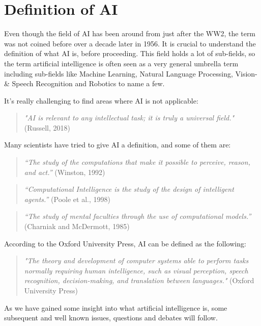\documentclass[
a4paper,
11pt,
english
]{report}
\begin{document}
\section{Definition of AI}
Even though the field of AI has been around from just after the WW2, the term was not coined before over a decade later in 1956. It is crucial to understand the definition of what AI is, before proceeding. This field holds a lot of sub-fields, so the term artificial intelligence is often seen as a very general umbrella term including sub-fields like Machine Learning, Natural Language Processing, Vision- \& Speech Recognition and Robotics to name a few.

It's really challenging to find areas where AI is not applicable:

\begin{quote}
    \textit{"AI is relevant to any intellectual task; it is truly a universal field."} (Russell, 2018)
\end{quote}

Many scientists have tried to give AI a definition, and some of them are:

\begin{quote}
    \textit{“The study of the computations that make it possible to perceive, reason, and act.”} (Winston, 1992)
\end{quote}

\begin{quote}
    \textit{“Computational Intelligence is the study of the design of intelligent agents.”} (Poole et al., 1998)
\end{quote}

\begin{quote}
    \textit{“The study of mental faculties through the use of computational models.”} (Charniak and McDermott, 1985)
\end{quote}

According to the Oxford University Press, AI can be defined as the following:

\begin{quote}
    \textit{"The theory and development of computer systems able to perform tasks normally requiring human intelligence, such as visual perception, speech recognition, decision-making, and translation between languages."} (Oxford University Press)
\end{quote}

As we have gained some insight into what artificial intelligence is, some subsequent and well known issues, questions and debates will follow.
\end{document}
